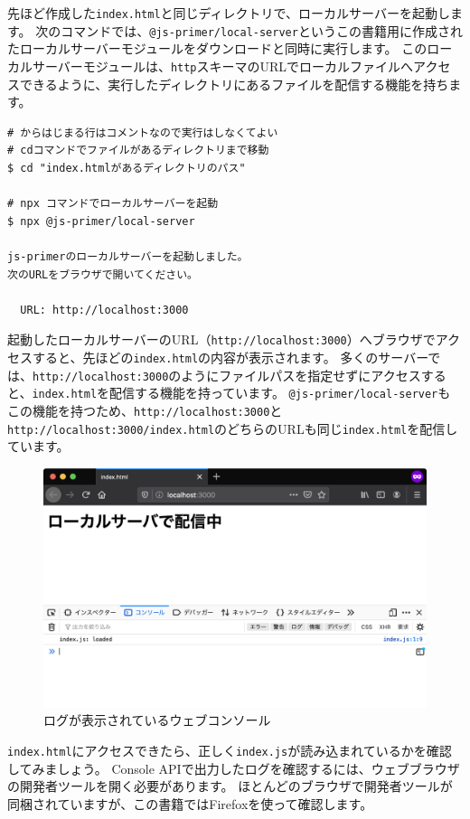 先ほど作成した\texttt{index.html}と同じディレクトリで、ローカルサーバーを起動します。
次のコマンドでは、\texttt{@js-primer/local-server}というこの書籍用に作成されたローカルサーバーモジュールをダウンロードと同時に実行します。
このローカルサーバーモジュールは、\texttt{http}スキーマのURLでローカルファイルへアクセスできるように、実行したディレクトリにあるファイルを配信する機能を持ちます。

\begin{lstlisting}
# からはじまる行はコメントなので実行はしなくてよい
# cdコマンドでファイルがあるディレクトリまで移動
$ cd "index.htmlがあるディレクトリのパス"

# npx コマンドでローカルサーバーを起動
$ npx @js-primer/local-server

js-primerのローカルサーバーを起動しました。
次のURLをブラウザで開いてください。

  URL: http://localhost:3000
\end{lstlisting}

起動したローカルサーバーのURL（\texttt{http://localhost:3000}）へブラウザでアクセスすると、先ほどの\texttt{index.html}の内容が表示されます。
多くのサーバーでは、\texttt{http://localhost:3000}のようにファイルパスを指定せずにアクセスすると、\texttt{index.html}を配信する機能を持っています。
\texttt{@js-primer/local-server}もこの機能を持つため、\texttt{http://localhost:3000}と\texttt{http://localhost:3000/index.html}のどちらのURLも同じ\texttt{index.html}を配信しています。

\begin{figure}[h]
\centering
\includegraphics[width=120mm]{fig/index.png}
\caption{ログが表示されているウェブコンソール}
\end{figure}

\texttt{index.html}にアクセスできたら、正しく\texttt{index.js}が読み込まれているかを確認してみましょう。
Console
APIで出力したログを確認するには、ウェブブラウザの開発者ツールを開く必要があります。
ほとんどのブラウザで開発者ツールが同梱されていますが、この書籍ではFirefoxを使って確認します。

